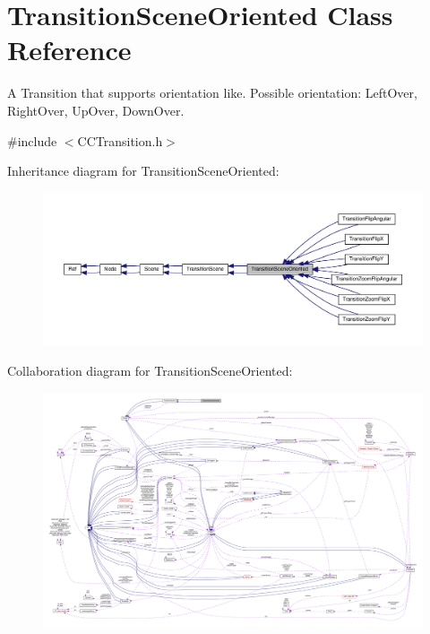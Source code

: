 \hypertarget{classTransitionSceneOriented}{}\section{Transition\+Scene\+Oriented Class Reference}
\label{classTransitionSceneOriented}


A Transition that supports orientation like. Possible orientation\+: Left\+Over, Right\+Over, Up\+Over, Down\+Over.  




{\ttfamily \#include $<$C\+C\+Transition.\+h$>$}



Inheritance diagram for Transition\+Scene\+Oriented\+:
\nopagebreak
\begin{figure}[H]
\begin{center}
\leavevmode
\includegraphics[width=350pt]{classTransitionSceneOriented__inherit__graph}
\end{center}
\end{figure}


Collaboration diagram for Transition\+Scene\+Oriented\+:
\nopagebreak
\begin{figure}[H]
\begin{center}
\leavevmode
\includegraphics[width=350pt]{classTransitionSceneOriented__coll__graph}
\end{center}
\end{figure}
